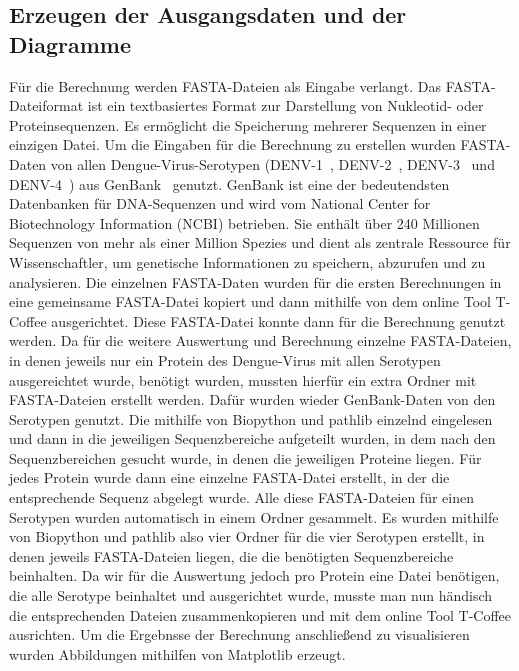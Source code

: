 \documentclass[german,version-2022-01]{uzl-thesis}
\begin{document}
\subsection{Erzeugen der Ausgangsdaten und der Diagramme}
F\"ur die Berechnung werden FASTA-Dateien als Eingabe verlangt. Das FASTA-Dateiformat ist ein textbasiertes Format zur Darstellung von Nukleotid- oder Proteinsequenzen. Es erm\"oglicht die Speicherung mehrerer Sequenzen in einer einzigen Datei. Um die Eingaben f\"ur die Berechnung zu erstellen wurden FASTA-Daten von allen Dengue-Virus-Serotypen (DENV-1~\cite{tittarelli_dengue_2014}, DENV-2~\cite{cao_retrospective_2023}, DENV-3~\cite{peyrefitte_genetic_2003} und DENV-4~\cite{wardhani_genetic_2023}) aus GenBank~\cite{genbank} genutzt. GenBank ist eine der bedeutendsten Datenbanken f\"ur DNA-Sequenzen und wird vom National Center for Biotechnology Information (NCBI) betrieben. Sie enth\"alt \"uber 240 Millionen Sequenzen von mehr als einer Million Spezies und dient als zentrale Ressource f\"ur Wissenschaftler, um genetische Informationen zu speichern, abzurufen und zu analysieren.
Die einzelnen FASTA-Daten wurden f\"ur die ersten Berechnungen in eine gemeinsame FASTA-Datei kopiert und dann mithilfe von dem online Tool T-Coffee ausgerichtet. Diese FASTA-Datei konnte dann f\"ur die Berechnung genutzt werden. Da f\"ur die weitere Auswertung und Berechnung einzelne FASTA-Dateien, in denen jeweils nur ein Protein des Dengue-Virus mit allen Serotypen ausgereichtet wurde, ben\"otigt wurden, mussten hierf\"ur ein extra Ordner mit FASTA-Dateien erstellt werden. Daf\"ur wurden wieder GenBank-Daten von den Serotypen genutzt. Die mithilfe von Biopython und pathlib einzelnd eingelesen und dann in die jeweiligen Sequenzbereiche aufgeteilt wurden, in dem nach den Sequenzbereichen gesucht wurde, in denen die jeweiligen Proteine liegen. F\"ur jedes Protein wurde dann eine einzelne FASTA-Datei erstellt, in der die entsprechende Sequenz abgelegt wurde. Alle diese FASTA-Dateien f\"ur einen Serotypen wurden automatisch in einem Ordner gesammelt. Es wurden mithilfe von Biopython und pathlib also vier Ordner f\"ur die vier Serotypen erstellt, in denen jeweils FASTA-Dateien liegen, die die ben\"otigten Sequenzbereiche beinhalten. Da wir f\"ur die Auswertung jedoch pro Protein eine Datei ben\"otigen, die alle Serotype beinhaltet und ausgerichtet wurde, musste man nun h\"andisch die entsprechenden Dateien zusammenkopieren und mit dem online Tool T-Coffee ausrichten. 
Um die Ergebnsse der Berechnung anschlie\ss{}end zu visualisieren wurden Abbildungen mithilfen von Matplotlib erzeugt.
\end{document}
